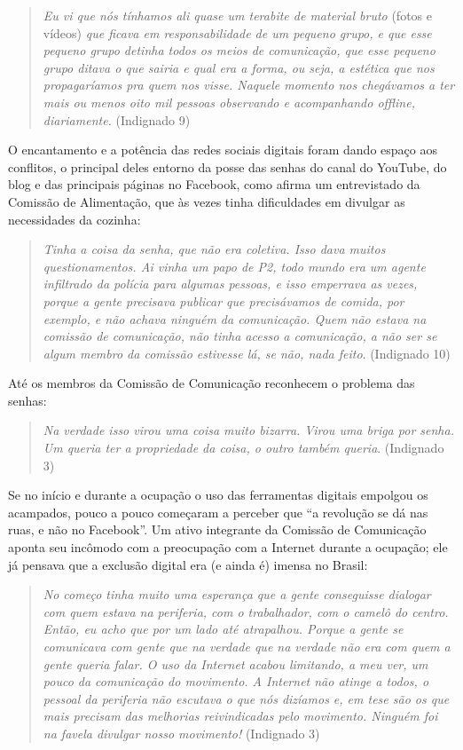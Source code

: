\begin{quote}
\emph{Eu vi que nós tínhamos ali quase um terabite de material bruto}
(fotos e vídeos) \emph{que ficava em responsabilidade de um pequeno
grupo, e que esse pequeno grupo detinha todos os meios de comunicação,
que esse pequeno grupo ditava o que sairia e qual era a forma, ou seja,
a estética que nos propagaríamos pra quem nos visse. Naquele momento nos
chegávamos a ter mais ou menos oito mil pessoas observando e
acompanhando \emph{offline}, diariamente.} (Indignado 9)
\end{quote}

O encantamento e a potência das redes sociais digitais foram dando
espaço aos conflitos, o principal deles entorno da posse das senhas do
canal do YouTube, do blog e das principais páginas no Facebook, como
afirma um entrevistado da Comissão de Alimentação, que às vezes tinha
dificuldades em divulgar as necessidades da cozinha:

\begin{quote}
\emph{Tinha a coisa da senha, que não era coletiva. Isso dava muitos
questionamentos. Ai vinha um papo de P2, todo mundo era um agente
infiltrado da polícia para algumas pessoas, e isso emperrava as vezes,
porque a gente precisava publicar que precisávamos de comida, por
exemplo, e não achava ninguém da comunicação. Quem não estava na
comissão de comunicação, não tinha acesso a comunicação, a não ser se
algum membro da comissão estivesse lá, se não, nada feito}. (Indignado
10)
\end{quote}

Até os membros da Comissão de Comunicação reconhecem o problema das
senhas:

\begin{quote}
\emph{Na verdade isso virou uma coisa muito bizarra. Virou uma briga por
senha. Um queria ter a propriedade da coisa, o outro também queria}.
(Indignado 3)
\end{quote}

Se no início e durante a ocupação o uso das ferramentas digitais
empolgou os acampados, pouco a pouco começaram a perceber que ``a
revolução se dá nas ruas, e não no Facebook''. Um ativo integrante da
Comissão de Comunicação aponta seu incômodo com a preocupação com a
Internet durante a ocupação; ele já pensava que a exclusão digital era
(e ainda é) imensa no Brasil:

\begin{quote}
\emph{No começo tinha muito uma esperança que a gente conseguisse
dialogar com quem estava na periferia, com o trabalhador, com o camelô
do centro. Então, eu acho que por um lado até atrapalhou. Porque a gente
se comunicava com gente que na verdade que na verdade não era com quem a
gente queria falar. O uso da Internet acabou limitando, a meu ver, um
pouco da comunicação do movimento. A Internet não atinge a todos, o
pessoal da periferia não escutava o que nós dizíamos e, em tese são os
que mais precisam das melhorias reivindicadas pelo movimento. Ninguém
foi na favela divulgar nosso movimento!} (Indignado 3)
\end{quote}

